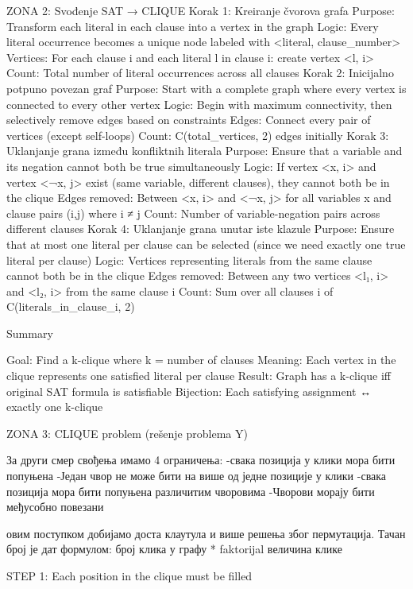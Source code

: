 \documentclass[12pt,oneside]{memoir}
\begin{document}
ZONA 2: Svođenje SAT → CLIQUE
Korak 1: Kreiranje čvorova grafa
Purpose: Transform each literal in each clause into a vertex in the graph
Logic: Every literal occurrence becomes a unique node labeled with <literal, clause_number>
Vertices: For each clause i and each literal l in clause i: create vertex <l, i>
Count: Total number of literal occurrences across all clauses
Korak 2: Inicijalno potpuno povezan graf
Purpose: Start with a complete graph where every vertex is connected to every other vertex
Logic: Begin with maximum connectivity, then selectively remove edges based on constraints
Edges: Connect every pair of vertices (except self-loops)
Count: C(total_vertices, 2) edges initially
Korak 3: Uklanjanje grana između konfliktnih literala
Purpose: Ensure that a variable and its negation cannot both be true simultaneously
Logic: If vertex <x, i> and vertex <¬x, j> exist (same variable, different clauses), they cannot both be in the clique
Edges removed: Between <x, i> and <¬x, j> for all variables x and clause pairs (i,j) where i ≠ j
Count: Number of variable-negation pairs across different clauses
Korak 4: Uklanjanje grana unutar iste klazule
Purpose: Ensure that at most one literal per clause can be selected (since we need exactly one true literal per clause)
Logic: Vertices representing literals from the same clause cannot both be in the clique
Edges removed: Between any two vertices <l₁, i> and <l₂, i> from the same clause i
Count: Sum over all clauses i of C(literals_in_clause_i, 2)

Summary

Goal: Find a k-clique where k = number of clauses
Meaning: Each vertex in the clique represents one satisfied literal per clause
Result: Graph has a k-clique iff original SAT formula is satisfiable
Bijection: Each satisfying assignment ↔ exactly one k-clique

ZONA 3: CLIQUE problem (rešenje problema Y)




За други смер свођења имамо 4 ограничења:
-свака позиција у клики мора бити попуњена
-Један чвор не може бити на више од једне позиције у клики
-свака позиција мора бити попуњена различитим чворовима
-Чворови морају бити међусобно повезани

овим поступком добијамо доста клаутула и више решења због пермутација. Тачан број је дат формулом:
број клика у графу * faktorijal величина клике 



STEP 1: Each position in the clique must be filled
\end{document}
